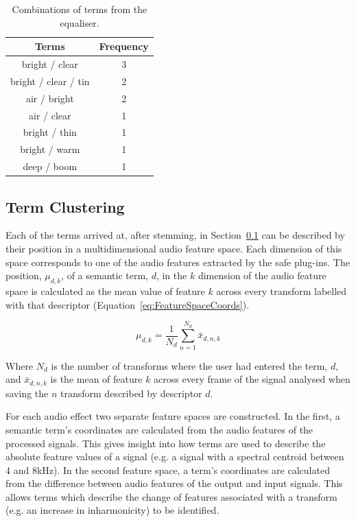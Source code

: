 		\begin{table}[h!]
			\centering
			\begin{tabular}{|c|c|}
				\hline
				\bf{Terms} & \bf{Frequency} \tabularnewline
				\hline
				\hline
				bright / clear & 3 \tabularnewline
				\hline
				bright / clear / tin & 2 \tabularnewline
				\hline
				air / bright & 2 \tabularnewline
				\hline
				air / clear & 1 \tabularnewline
				\hline
				bright / thin & 1 \tabularnewline
				\hline
				bright / warm & 1 \tabularnewline
				\hline
				deep / boom & 1 \tabularnewline
				\hline
			\end{tabular}
			\caption{Combinations of terms from the equaliser.}
			\label{tab:EqualiserTermCombinations}
		\end{table}
		
	\subsection{Term Clustering}
	\label{sec:TimbreEvaluation-Analysis-TermClustering}
		Each of the terms arrived at, after stemming, in Section~\ref{sec:TimbreEvaluation-Analysis-TermClustering}
		can be described by their position in a multidimensional audio feature space. Each dimension of this space
		corresponds to one of the audio features extracted by the \acrshort{safe} plug-ins. The position,
		$\mu_{d,k}$, of a semantic term, $d$, in the $k$ dimension of the audio feature space is
		calculated as the mean value of feature $k$ across every transform labelled with that descriptor
		(Equation~\ref{eq:FeatureSpaceCoords}).

		\begin{equation}
			\mu_{d,k} = \frac{1}{N_{d}} \sum_{n = 1}^{N_{d}} \bar{x}_{d,n,k}
			\label{eq:FeatureSpaceCoords}
		\end{equation}

		Where $N_{d}$ is the number of transforms where the user had entered the term, $d$, and $\bar{x}_{d,n,k}$
		is the mean of feature $k$ across every frame of the signal analysed when saving the $n$
		transform described by descriptor $d$.
		
		For each audio effect two separate feature spaces are constructed. In the first, a semantic term's
		coordinates are calculated from the audio features of the processed signals. This gives insight into how
		terms are used to describe the absolute feature values of a signal (e.g. a signal with a spectral centroid
		between 4 and 8kHz). In the second feature space, a term's coordinates are calculated from the difference
		between audio features of the output and input signals. This allows terms which describe the change of
		features associated with a transform (e.g. an increase in inharmonicity) to be identified.

